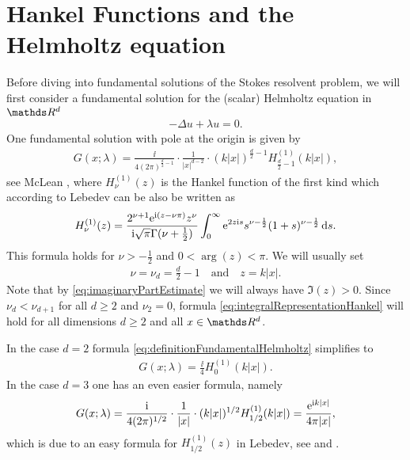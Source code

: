 \section{Hankel Functions and the Helmholtz equation}

Before diving into fundamental solutions of the Stokes resolvent problem, we will first consider a fundamental solution for the (scalar) Helmholtz equation in $\R^d$
\begin{align*}
-\Delta u + \lambda u = 0.
\end{align*}
One fundamental solution with pole at the origin is given by
\begin{align}
  \label{eq:definitionFundamentalHelmholtz}
  G(x; \lambda) = \frac{\ii}{4 ( 2\pi )^{\frac{d}{2} - 1}} \cdot \frac{1}{|x|^{d - 2}} \cdot (k |x|)^{\frac{d}{2} - 1} H_{\frac{d}{2} - 1}^{(1)} (k|x|),
\end{align}
see McLean \cite[Eq. (9.14)]{mclean}, where $H_{\nu}^{(1)}(z)$ is the Hankel function of the first kind which according to Lebedev \cite[Sec. 5.11]{lebedev} can be also be written as
\begin{align}
  \label{eq:integralRepresentationHankel}
  H_\nu^{(1)}(z) = \frac{2^{\nu + 1} \mathrm{e}^{\mathrm{i}(z - \nu \pi)} z^\nu}{\mathrm{i} \sqrt{\pi} \Gamma(\nu + \frac{1}{2})} \int_0^\infty \mathrm{e}^{2 z \mathrm{i} s} s^{\nu - \frac{1}{2}} (1 + s)^{\nu - \frac{1}{2}} \, {\operatorname{d}\!{s}}.
\end{align}
This formula holds for $\nu > -\frac{1}{2}$ and $0 < \arg(z) < \pi$.
We will usually set 
\begin{align*}
  \nu = \nu_d = \frac{d}{2} - 1 \quad\text{and}\quad z = k|x|. 
\end{align*}
Note that by \eqref{eq:imaginaryPartEstimate} we will always have $\Im(z) > 0$. 
Since $\nu_d < \nu_{d + 1}$ for all $d \geq 2$ and $\nu_2 = 0$, formula \eqref{eq:integralRepresentationHankel} will hold for all dimensions $d \geq 2$ and all $x \in \R^d$.

In the case $d = 2$ formula \eqref{eq:definitionFundamentalHelmholtz} simplifies to 
\begin{align}
  \label{eq:2dDefinitionFundamentalHelmholtz}
  G(x;\lambda) = \frac{\ii}{4} H_{0}^{(1)}(k|x|).
\end{align}
In the case $d = 3$ one has an even easier formula, namely
\begin{align}
  \label{eq:3dDefinitionFundamentalHelmholtz}
  G(x; \lambda) = \frac{\mathrm{i}}{4(2\pi)^{1/2}} \cdot \frac{1}{|x|} \cdot (k |x|)^{1/2} H_{1/2}^{(1)}(k|x|) =  \frac{\mathrm{e}^{\mathrm{i} k |x|}}{4 \pi |x|},
\end{align}
which is due to an easy formula for $H_{1/2}^{(1)}(z)$ in Lebedev, see \cite[Eq. (5.8.4)]{lebedev} and \cite[Eq. (9.15)]{mclean}.

